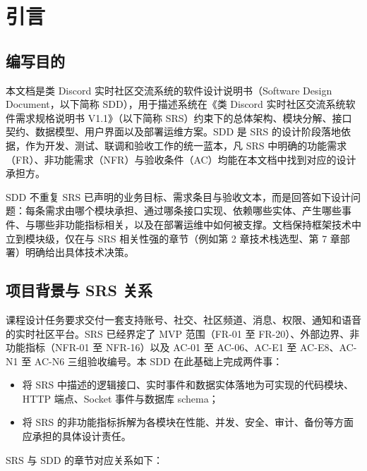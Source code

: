 \section{引言}

\subsection{编写目的}
本文档是类 Discord 实时社区交流系统的软件设计说明书（Software Design Document，以下简称 SDD），用于描述系统在《类 Discord 实时社区交流系统软件需求规格说明书 V1.1》（以下简称 SRS）约束下的总体架构、模块分解、接口契约、数据模型、用户界面以及部署运维方案。SDD 是 SRS 的设计阶段落地依据，作为开发、测试、联调和验收工作的统一蓝本，凡 SRS 中明确的功能需求（FR）、非功能需求（NFR）与验收条件（AC）均能在本文档中找到对应的设计承担方。

SDD 不重复 SRS 已声明的业务目标、需求条目与验收文本，而是回答如下设计问题：每条需求由哪个模块承担、通过哪条接口实现、依赖哪些实体、产生哪些事件、与哪些非功能指标相关，以及在部署运维中如何被支撑。文档保持框架技术中立到模块级，仅在与 SRS 相关性强的章节（例如第 2 章技术栈选型、第 7 章部署）明确给出具体技术决策。

\subsection{项目背景与 SRS 关系}
课程设计任务要求交付一套支持账号、社交、社区频道、消息、权限、通知和语音的实时社区平台。SRS 已经界定了 MVP 范围（FR-01 至 FR-20）、外部边界、非功能指标（NFR-01 至 NFR-16）以及 AC-01 至 AC-06、AC-E1 至 AC-E8、AC-N1 至 AC-N6 三组验收编号。本 SDD 在此基础上完成两件事：

\begin{itemize}
  \item 将 SRS 中描述的逻辑接口、实时事件和数据实体落地为可实现的代码模块、HTTP 端点、Socket 事件与数据库 schema；
  \item 将 SRS 的非功能指标拆解为各模块在性能、并发、安全、审计、备份等方面应承担的具体设计责任。
\end{itemize}

SRS 与 SDD 的章节对应关系如下：

